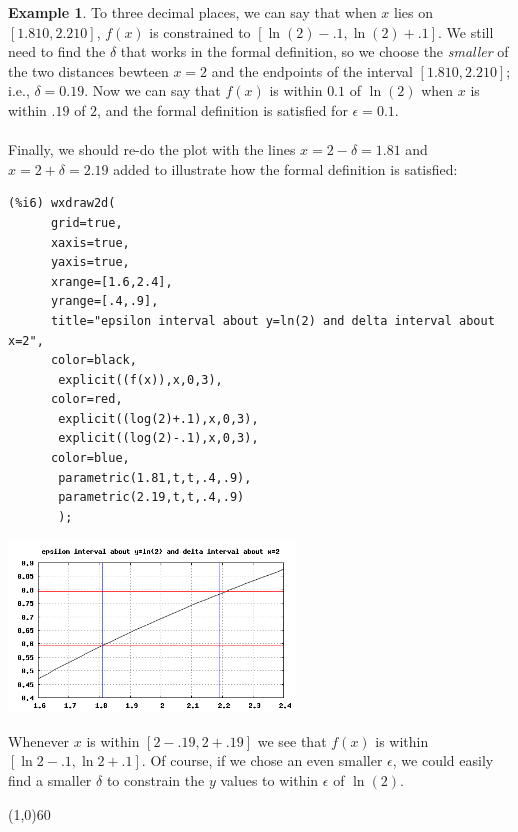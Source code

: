 \documentclass[10.5pt,twoside]{report}
\theoremstyle{definition}
\newtheorem{exmp}{Example}[section]
\begin{document}
\begin{exmp}
To three decimal places, we can say that when $x$ lies on $[1.810,2.210]$, $f(x)$ is constrained to $[\ln(2)-.1,\ln(2)+.1]$.  We still need to find the $\delta$ that works in the formal definition, so we choose the \textit{smaller} of the two distances bewteen $x=2$ and the endpoints of the interval $[1.810,2.210]$; i.e., $\delta=0.19$.  Now we can say that $f(x)$ is within $0.1$ of $\ln(2)$ when $x$ is within $.19$ of $2$, and the formal definition is satisfied for $\epsilon=0.1$.\\
${}$\\
Finally, we should re-do the plot with the lines $x=2-\delta=1.81$ and $x=2+\delta=2.19$ added to illustrate how the formal definition is satisfied:

\begin{verbatim}
(%i6) wxdraw2d(
      grid=true,
      xaxis=true,
      yaxis=true,
      xrange=[1.6,2.4],
      yrange=[.4,.9],
      title="epsilon interval about y=ln(2) and delta interval about x=2",
      color=black,
       explicit((f(x)),x,0,3),
      color=red,
       explicit((log(2)+.1),x,0,3),
       explicit((log(2)-.1),x,0,3),
      color=blue,
       parametric(1.81,t,t,.4,.9),
       parametric(2.19,t,t,.4,.9)
       );
\end{verbatim}

\includegraphics[width=3in]{example_3_3_1_2}

Whenever $x$ is within $[2-.19,2+.19]$ we see that $f(x)$ is within $[\ln2-.1,\ln2+.1]$.  Of course, if we chose an even smaller $\epsilon$, we could easily find a smaller $\delta$ to constrain the $y$ values to within $\epsilon$ of $\ln(2)$.


\end{exmp}

\line(1,0){60}
\linethickness{0.5mm}
\end{document}

